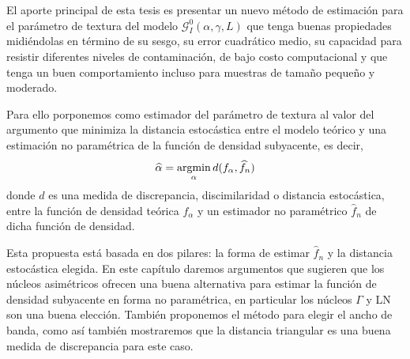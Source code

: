 

El aporte principal de esta tesis es presentar un nuevo método de estimación para el parámetro de textura del modelo $\mathcal{G}_I^0(\alpha,\gamma,L)$ que tenga  buenas propiedades midiéndolas en término de su sesgo, su error cuadrático medio, su capacidad para resistir diferentes niveles de contaminación, de bajo costo computacional y que tenga un buen comportamiento incluso para muestras de tamaño pequeño y moderado. 

Para ello porponemos como estimador del parámetro de textura al valor del argumento que minimiza la distancia estocástica entre el modelo teórico y una estimación no paramétrica de la función de densidad subyacente, es decir,
\begin{align}
\label{PropuestaMDE}
\widehat{\alpha}=\mathop{\rm argmin} \limits_{\alpha} d(f_{\alpha}, \widehat{f}_n)
\end{align}
donde $d$ es una medida de discrepancia, discimilaridad o distancia estocástica, entre la función de densidad teórica $f_{\alpha}$ y un estimador no paramétrico $\widehat{f}_n$ de dicha función de densidad.

Esta propuesta está basada en dos pilares: la forma de estimar $\widehat{f}_n$ y la distancia estocástica elegida. En este capítulo daremos argumentos que sugieren que los núcleos asimétricos ofrecen una buena alternativa para estimar la función de densidad subyacente en forma no paramétrica, en particular los núcleos $\Gamma$ y LN son una buena elección. También proponemos el método para elegir el ancho de banda, como así también mostraremos que la distancia triangular es una buena medida de discrepancia para este caso.

